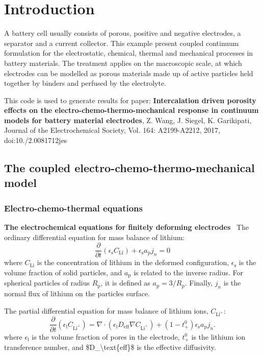 \hypertarget{growth_Introduction}{}\section{Introduction}\label{growth_Introduction}
A battery cell usually consists of porous, positive and negative electrodes, a separator and a current collector. This example present coupled continuum formulation for the electrostatic, chemical, thermal and mechanical processes in battery materials. The treatment applies on the macroscopic scale, at which electrodes can be modelled as porous materials made up of active particles held together by binders and perfused by the electrolyte.

This code is used to generate results for paper\+: {\bfseries{Intercalation driven porosity effects on the electro-\/chemo-\/thermo-\/mechanical response in continuum models for battery material electrodes}}, Z. Wang, J. Siegel, K. Garikipati, Journal of the Electrochemical Society, Vol. 164\+: A2199-\/\+A2212, 2017, doi\+:10./2.0081712jes  \hypertarget{battery_particle_section1}{}\subsection{The coupled electro-\/chemo-\/thermo-\/mechanical model}\label{battery_particle_section1}
\hypertarget{battery_particle_subsub1}{}\subsubsection{Electro-\/chemo-\/thermal equations}\label{battery_particle_subsub1}
{\bfseries{The electrochemical equations for finitely deforming electrodes}}~\newline
 The ordinary differential equation for mass balance of lithium\+: \[ \frac{\partial}{\partial t}({\epsilon_\text{s}C_\text{Li}})+\epsilon_\text{s}{a_\text{p}}j_n=0 \] where $C_\text{Li}$ is the concentration of lithium in the deformed configuration, $\epsilon_\text{s}$ is the volume fraction of solid particles, and $a_\text{p}$ is related to the inverse radius. For spherical particles of radius $R_\text{p}$, it is defined as $a_\text{p} = 3/R_\text{p}$. Finally, $j_n$ is the normal flux of lithium on the particle\textquotesingle{}s surface.

The partial differential equation for mass balance of lithium ions, $C_{\text{Li}^+}$\+: \[ \frac{\partial }{\partial t}(\epsilon_\text{l}C_{\text{Li}^+})=\nabla\cdot (\epsilon_\text{l}D_\text{eff}\nabla C_{\text{Li}^+})+(1-t^0_+)\epsilon_\text{s}{a_\text{p}}j_n. \] where $\epsilon_\text{l}$ is the volume fraction of pores in the electrode, $t^0_+$ is the lithium ion transference number, and \$\+D\+\_\+\textbackslash{}text\{eff\}\$ is the effective diffusivity.

